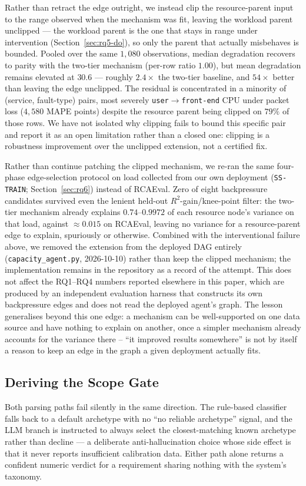 \documentclass[journal, 10pt]{IEEEtran}
\begin{document}
Rather than retract the edge outright, we instead clip the resource-parent input
to the range observed when the mechanism was fit, leaving the workload parent
unclipped --- the workload parent is the one that stays in range under
intervention (Section~\ref{sec:rq5-do}), so only the parent that actually
misbehaves is bounded. Pooled over the same $1{,}080$ observations, median
degradation recovers to parity with the two-tier mechanism (per-row ratio
$1.00$), but mean degradation remains elevated at $30.6$ --- roughly $2.4\times$
the two-tier baseline, and $54\times$ better than leaving the edge unclipped.
The residual is concentrated in a minority of (service, fault-type) pairs, most
severely \texttt{user}$\to$\texttt{front-end} CPU under packet loss ($4{,}580$
MAPE points) despite the resource parent being clipped on $79\%$ of those rows.
We have not isolated why clipping fails to bound this specific pair and report
it as an open limitation rather than a closed one: clipping is a robustness
improvement over the unclipped extension, not a certified fix.

Rather than continue patching the clipped mechanism, we re-ran the same
four-phase edge-selection protocol on load collected from our own deployment
(\texttt{SS-TRAIN}; Section~\ref{sec:rq6}) instead of RCAEval. Zero of eight
backpressure candidates survived even the lenient held-out $R^2$-gain/knee-point
filter: the two-tier mechanism already explains $0.74$--$0.9972$ of each
resource node's variance on that load, against $\approx 0.015$ on RCAEval,
leaving no variance for a resource-parent edge to explain, spuriously or
otherwise. Combined with the interventional failure above, we removed the
extension from the deployed DAG entirely (\texttt{capacity\_agent.py},
2026-10-10) rather than keep the clipped mechanism; the implementation remains
in the repository as a record of the attempt. This does not affect the RQ1--RQ4
numbers reported elsewhere in this paper, which are produced by an independent
evaluation harness that constructs its own backpressure edges and does not read
the deployed agent's graph. The lesson generalises beyond this one edge: a
mechanism can be well-supported on one data source and have nothing to explain
on another, once a simpler mechanism already accounts for the variance there --
``it improved results somewhere'' is not by itself a reason to keep an edge in
the graph a given deployment actually fits.


\subsection{Deriving the Scope Gate}
\label{sec:edge-of-scope}
Both parsing paths fail silently in the same direction. The rule-based classifier
falls back to a default archetype with no ``no reliable archetype'' signal, and
the LLM branch is instructed to always select the closest-matching known
archetype rather than decline --- a deliberate anti-hallucination choice whose
side effect is that it never reports insufficient calibration data. Either path
alone returns a confident numeric verdict for a requirement sharing nothing with
the system's taxonomy.
\end{document}
